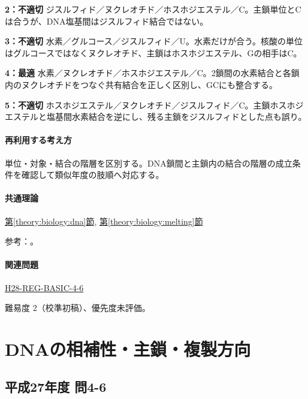 \noindent\textbf{2：不適切} ジスルフィド／ヌクレオチド／ホスホジエステル／C。主鎖単位とCは合うが、DNA塩基間はジスルフィド結合ではない。\par

\noindent\textbf{3：不適切} 水素／グルコース／ジスルフィド／U。水素だけが合う。核酸の単位はグルコースではなくヌクレオチド、主鎖はホスホジエステル、Gの相手はC。\par

\noindent\textbf{4：最適} 水素／ヌクレオチド／ホスホジエステル／C。2鎖間の水素結合と各鎖内のヌクレオチドをつなぐ共有結合を正しく区別し、GCにも整合する。\par

\noindent\textbf{5：不適切} ホスホジエステル／ヌクレオチド／ジスルフィド／C。主鎖ホスホジエステルと塩基間水素結合を逆にし、残る主鎖をジスルフィドとした点も誤り。\par

\paragraph{再利用する考え方} 単位・対象・結合の階層を区別する。DNA鎖間と主鎖内の結合の階層の成立条件を確認して類似年度の肢順へ対応する。

\paragraph{共通理論} \hyperref[theory:biology:dna]{第\ref*{theory:biology:dna}節}, \hyperref[theory:biology:melting]{第\ref*{theory:biology:melting}節}

\par 参考：\cite{bu_dna_melting,nhgri_dna}。

\paragraph{関連問題} \hyperref[q:h28-reg-basic-4-6]{H28-REG-BASIC-4-6}

\par 難易度 2（校準初稿）、優先度未評価。

\section{DNAの相補性・主鎖・複製方向}

\subsection{平成27年度 問4-6}
\label{q:h27-reg-basic-4-6}

